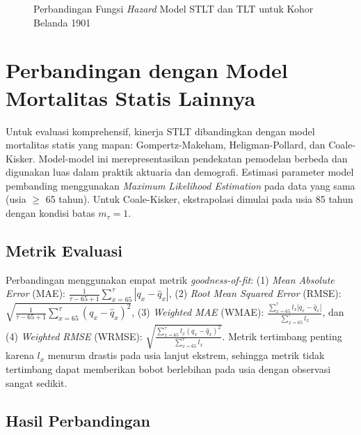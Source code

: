 \begin{figure}[htbp]
\centering
\caption{Perbandingan Fungsi \textit{Hazard} Model STLT dan TLT untuk Kohor Belanda 1901}
\label{fig:stlt_hazard_comparison}
\end{figure}
\section{Perbandingan dengan Model Mortalitas Statis Lainnya}

Untuk evaluasi komprehensif, kinerja STLT dibandingkan dengan model mortalitas statis yang mapan: Gompertz-Makeham, Heligman-Pollard, dan Coale-Kisker. Model-model ini merepresentasikan pendekatan pemodelan berbeda dan digunakan luas dalam praktik aktuaria dan demografi. Estimasi parameter model pembanding menggunakan \textit{Maximum Likelihood Estimation} pada data yang sama (usia $\geq$ 65 tahun). Untuk Coale-Kisker, ekstrapolasi dimulai pada usia 85 tahun dengan kondisi batas $m_\tau = 1$.

\subsection{Metrik Evaluasi}

Perbandingan menggunakan empat metrik \textit{goodness-of-fit}: (1) \textit{Mean Absolute Error} (MAE): $\frac{1}{\tau - 65 + 1} \sum_{x=65}^{\tau} |q_x - \hat{q}_x|$, (2) \textit{Root Mean Squared Error} (RMSE): $\sqrt{\frac{1}{\tau - 65 + 1} \sum_{x=65}^{\tau} (q_x - \hat{q}_x)^2}$, (3) \textit{Weighted MAE} (WMAE): $\frac{\sum_{x=65}^{\tau} l_x |q_x - \hat{q}_x|}{\sum_{x=65}^{\tau} l_x}$, dan (4) \textit{Weighted RMSE} (WRMSE): $\sqrt{\frac{\sum_{x=65}^{\tau} l_x (q_x - \hat{q}_x)^2}{\sum_{x=65}^{\tau} l_x}}$. Metrik tertimbang penting karena $l_x$ menurun drastis pada usia lanjut ekstrem, sehingga metrik tidak tertimbang dapat memberikan bobot berlebihan pada usia dengan observasi sangat sedikit.

\subsection{Hasil Perbandingan}

